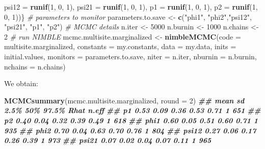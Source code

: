\documentclass[
  12pt,
]{krantz}
\newenvironment{Shaded}{\begin{snugshade}}{\end{snugshade}}
\newcommand{\AttributeTok}[1]{\textcolor[rgb]{0.13,0.29,0.53}{#1}}
\newcommand{\CommentTok}[1]{\textcolor[rgb]{0.56,0.35,0.01}{\textit{#1}}}
\newcommand{\DecValTok}[1]{\textcolor[rgb]{0.00,0.00,0.81}{#1}}
\newcommand{\DocumentationTok}[1]{\textcolor[rgb]{0.56,0.35,0.01}{\textbf{\textit{#1}}}}
\newcommand{\FunctionTok}[1]{\textcolor[rgb]{0.13,0.29,0.53}{\textbf{#1}}}
\newcommand{\NormalTok}[1]{#1}
\newcommand{\OtherTok}[1]{\textcolor[rgb]{0.56,0.35,0.01}{#1}}
\newcommand{\StringTok}[1]{\textcolor[rgb]{0.31,0.60,0.02}{#1}}
\begin{document}
\begin{Shaded}
\begin{Highlighting}[]
                                  \AttributeTok{psi12 =} \FunctionTok{runif}\NormalTok{(}\DecValTok{1}\NormalTok{, }\DecValTok{0}\NormalTok{, }\DecValTok{1}\NormalTok{), }
                                  \AttributeTok{psi21 =} \FunctionTok{runif}\NormalTok{(}\DecValTok{1}\NormalTok{, }\DecValTok{0}\NormalTok{, }\DecValTok{1}\NormalTok{), }
                                  \AttributeTok{p1 =} \FunctionTok{runif}\NormalTok{(}\DecValTok{1}\NormalTok{, }\DecValTok{0}\NormalTok{, }\DecValTok{1}\NormalTok{), }
                                  \AttributeTok{p2 =} \FunctionTok{runif}\NormalTok{(}\DecValTok{1}\NormalTok{, }\DecValTok{0}\NormalTok{, }\DecValTok{1}\NormalTok{))\}}
\CommentTok{\# parameters to monitor}
\NormalTok{parameters.to.save }\OtherTok{\textless{}{-}} \FunctionTok{c}\NormalTok{(}\StringTok{"phi1"}\NormalTok{, }\StringTok{"phi2"}\NormalTok{,}\StringTok{"psi12"}\NormalTok{, }\StringTok{"psi21"}\NormalTok{, }\StringTok{"p1"}\NormalTok{, }\StringTok{"p2"}\NormalTok{)}
\CommentTok{\# MCMC details}
\NormalTok{n.iter }\OtherTok{\textless{}{-}} \DecValTok{5000}
\NormalTok{n.burnin }\OtherTok{\textless{}{-}} \DecValTok{1000}
\NormalTok{n.chains }\OtherTok{\textless{}{-}} \DecValTok{2}
\CommentTok{\# run NIMBLE}
\NormalTok{mcmc.multisite.marginalized }\OtherTok{\textless{}{-}} \FunctionTok{nimbleMCMC}\NormalTok{(}\AttributeTok{code =}\NormalTok{ multisite.marginalized, }
                             \AttributeTok{constants =}\NormalTok{ my.constants,}
                             \AttributeTok{data =}\NormalTok{ my.data,              }
                             \AttributeTok{inits =}\NormalTok{ initial.values,}
                             \AttributeTok{monitors =}\NormalTok{ parameters.to.save,}
                             \AttributeTok{niter =}\NormalTok{ n.iter,}
                             \AttributeTok{nburnin =}\NormalTok{ n.burnin, }
                             \AttributeTok{nchains =}\NormalTok{ n.chains)}
\end{Highlighting}
\end{Shaded}

We obtain:

\begin{Shaded}
\begin{Highlighting}[]
\FunctionTok{MCMCsummary}\NormalTok{(mcmc.multisite.marginalized, }\AttributeTok{round =} \DecValTok{2}\NormalTok{)}
\DocumentationTok{\#\#       mean   sd 2.5\%  50\% 97.5\% Rhat n.eff}
\DocumentationTok{\#\# p1    0.53 0.09 0.36 0.53  0.71    1   651}
\DocumentationTok{\#\# p2    0.40 0.04 0.32 0.39  0.49    1   618}
\DocumentationTok{\#\# phi1  0.60 0.05 0.51 0.60  0.71    1   935}
\DocumentationTok{\#\# phi2  0.70 0.04 0.63 0.70  0.76    1   804}
\DocumentationTok{\#\# psi12 0.27 0.06 0.17 0.26  0.39    1   973}
\DocumentationTok{\#\# psi21 0.07 0.02 0.04 0.07  0.11    1   965}
\end{Highlighting}
\end{Shaded}
\end{document}

